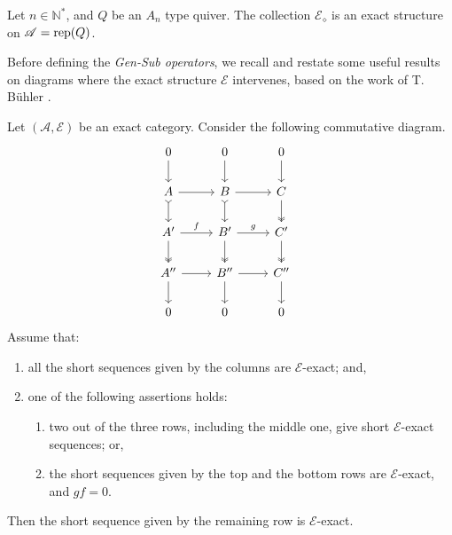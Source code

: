 \begin{prop}
 \label{prop:EdiamondExactStructureTypeA}
     Let $n \in \mathbb{N}^*$, and $Q$ be an $A_n$ type quiver. The collection $\mathcal{E}_{\diamond}$ is an exact structure on $\mathscr{A} = \operatorname{rep}(Q)$.
 \end{prop}

Before defining the \emph{Gen-Sub operators}, we recall and restate some useful results on diagrams where the exact structure $\mathcal{E}$ intervenes, based on the work of T. Bühler \cite{B10}.

\begin{lemma} \label{lem:3x3}
Let $(\mathscr{A}, \mathcal{E})$ be an exact category. Consider the following commutative diagram.
\[\begin{tikzcd}
         & 0 & 0 & 0 &  \\
	& A & B  & C &   \\
      & A' & B' & C' &  \\
       & A'' & B'' & C'' &  \\
       & 0 & 0 & 0 & 
	\arrow[from=2-2, to=2-3]
	\arrow[from=2-3, to=2-4]
	\arrow["f",from=3-2, to=3-3]
	\arrow["g",from=3-3, to=3-4]
	\arrow[from=4-2, to=4-3]
	\arrow[from=4-3, to=4-4]
        \arrow[from=4-2, to=5-2]
	\arrow[two heads, from=3-2, to=4-2]
	\arrow[tail,from=2-2, to=3-2]
	\arrow[from=1-2, to=2-2]
        \arrow[from=4-3, to=5-3]
	\arrow[two heads, from=3-3, to=4-3]
	\arrow[tail,from=2-3, to=3-3]
	\arrow[from=1-3, to=2-3]
        \arrow[from=4-4, to=5-4]
	\arrow[two heads, from=3-4, to=4-4]
	\arrow[two heads,from=2-4, to=3-4]
	\arrow[from=1-4, to=2-4]
\end{tikzcd} \]
Assume that:
\begin{enumerate}[label=$\bullet$, itemsep=1mm]
    \item all the short sequences given by the columns are $\mathcal{E}$-exact; and,
    \item one of the following assertions holds:
    \begin{enumerate}[label=$\bullet$,itemsep=1mm]
        \item two out of the three rows, including the middle one, give short $\mathcal{E}$-exact sequences; or,
        \item the short sequences given by the top and the bottom rows are $\mathcal{E}$-exact, and $gf = 0$.
    \end{enumerate}
\end{enumerate}
Then the short sequence given by the remaining row is $\mathcal{E}$-exact.
\end{lemma}

